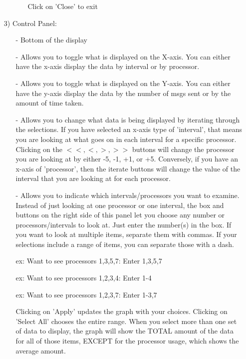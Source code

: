 \documentclass[10pt]{article}
\begin{document}
\begin{enumerate}
\begin{itemize}
\begin{itemize}
      Click on 'Close' to exit
      \end{itemize}
   \end{itemize}
\item[3)]
Control Panel:
   \begin{itemize}
   \item[-]
   Bottom of the display
   \item[-]
   Allows you to toggle what is displayed on the X-axis.  You can either
   have the x-axis display the data by interval or by processor.
   \item[-]
   Allows you to toggle what is displayed on the Y-axis.  You can
   either have the y-axis display the data by the number of msgs sent
   or by the amount of time taken.
   \item[-]
   Allows you to change what data is being displayed by iterating
   through the selections.  If you have selected an x-axis type of
   'interval', that means you are looking at what goes on in each
   interval for a specific processor.  Clicking on the $<<, <, >, >>$
   buttons will change the processor you are looking at by either -5,
   -1, +1, or +5.  Conversely, if you have an x-axis of 'processor',
   then the iterate buttons will change the value of the interval that
   you are looking at for each processor.
   \item[-]
   Allows you to indicate which intervals/processors you want to
   examine.  Instead of just looking at one processor or one interval,
   the box and buttons on the right side of this panel let you choose
   any number or processors/intervals to look at.  Just enter the
   number(s) in the box.  If you want to look at multiple items,
   separate them with commas.  If your selections include a range of
   items, you can separate those with a dash.

   ex: Want to see processors 1,3,5,7:  Enter 1,3,5,7

   ex: Want to see processors 1,2,3,4:  Enter 1-4

   ex: Want to see processors 1,2,3,7:  Enter 1-3,7

   Clicking on 'Apply' updates the graph with your choices. Clicking
   on 'Select All' chooses the entire range.  When you select more
   than one set of data to display, the graph will show the TOTAL
   amount of the data for all of those items, EXCEPT for the processor
   usage, which shows the average amount.
   \end{itemize}
\end{enumerate}
\end{document}
